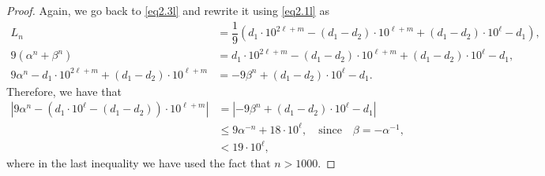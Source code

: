 \begin{proof}
Again, we go back to \eqref{eq2.3l} and rewrite it using \eqref{eq2.1l} as	
\begin{align*}
	L_n 
	&=\dfrac{1}{9}\left(d_1\cdot 10^{2\ell+m}-(d_1-d_2)\cdot 10^{\ell+m} +(d_1-d_2)\cdot 10^{\ell}-d_1 \right),\\
	9(\alpha^n+\beta^n) 
	&=d_1\cdot 10^{2\ell+m}-(d_1-d_2)\cdot 10^{\ell+m} +(d_1-d_2)\cdot 10^{\ell}-d_1, \\
	9\alpha^n-d_1\cdot 10^{2\ell+m} +(d_1-d_2)\cdot 10^{\ell+m}&=-9\beta^n +(d_1-d_2)\cdot 10^{\ell}-d_1.
\end{align*}	
Therefore, we have that
\begin{align*}
	\left|9\alpha^n-(d_1\cdot 10^{\ell}-(d_1-d_2))\cdot 10^{\ell+m}\right| &=\left|-9\beta^n +(d_1-d_2)\cdot 10^{\ell}-d_1\right|\\
	&\le 9\alpha^{-n}+18\cdot 10^{\ell},\quad\text{since}\quad \beta=-\alpha^{-1},\\
	&<19\cdot 10^{\ell},
\end{align*}	
where in the last inequality we have used the fact that $n>1000$. 


\end{proof}
